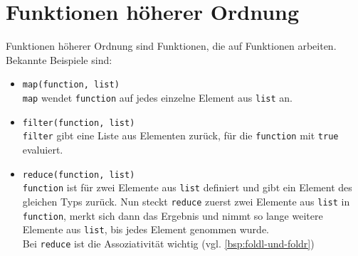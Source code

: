 
\section{Funktionen höherer Ordnung}
Funktionen höherer Ordnung sind Funktionen, die auf Funktionen arbeiten.
Bekannte Beispiele sind:
\begin{itemize}
    \item \texttt{map(function, list)}\\
          \texttt{map} wendet \texttt{function} auf jedes einzelne
          Element aus \texttt{list} an.
    \item \texttt{filter(function, list)}\\
          \texttt{filter} gibt eine Liste aus Elementen zurück, für 
          die \texttt{function} mit \texttt{true} evaluiert.
    \item \texttt{reduce(function, list)}\\
          \texttt{function} ist für zwei Elemente aus \texttt{list}
          definiert und gibt ein Element des gleichen Typs zurück.
          Nun steckt \texttt{reduce} zuerst zwei Elemente aus \texttt{list}
          in \texttt{function}, merkt sich dann das Ergebnis und nimmt
          so lange weitere Elemente aus \texttt{list}, bis jedes 
          Element genommen wurde.\\
          Bei \texttt{reduce} ist die Assoziativität wichtig (vgl. \cref{bsp:foldl-und-foldr})
\end{itemize}
